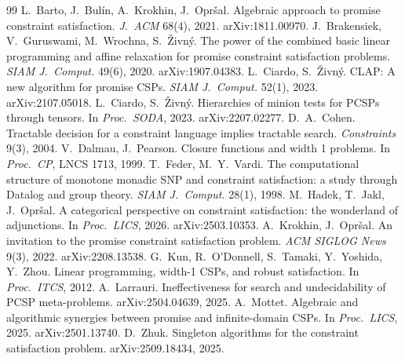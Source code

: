 \documentclass[11pt]{article}
\theoremstyle{plain}
\theoremstyle{definition}
\begin{document}
{\small
\begin{thebibliography}{99}
 L.~Barto, J.~Bulín, A.~Krokhin, J.~Opršal. Algebraic approach to promise constraint satisfaction. \emph{J.~ACM} 68(4), 2021. arXiv:1811.00970.
 J.~Brakensiek, V.~Guruswami, M.~Wrochna, S.~Živný. The power of the combined basic linear programming and affine relaxation for promise constraint satisfaction problems. \emph{SIAM J.~Comput.} 49(6), 2020. arXiv:1907.04383.
 L.~Ciardo, S.~Živný. CLAP: A new algorithm for promise CSPs. \emph{SIAM J.~Comput.} 52(1), 2023. arXiv:2107.05018.
 L.~Ciardo, S.~Živný. Hierarchies of minion tests for PCSPs through tensors. In \emph{Proc.\ SODA}, 2023. arXiv:2207.02277.
 D.~A.~Cohen. Tractable decision for a constraint language implies tractable search. \emph{Constraints} 9(3), 2004.
 V.~Dalmau, J.~Pearson. Closure functions and width 1 problems. In \emph{Proc.\ CP}, LNCS 1713, 1999.
 T.~Feder, M.~Y.~Vardi. The computational structure of monotone monadic SNP and constraint satisfaction: a study through Datalog and group theory. \emph{SIAM J.~Comput.} 28(1), 1998.
 M.~Hadek, T.~Jakl, J.~Opršal. A categorical perspective on constraint satisfaction: the wonderland of adjunctions. In \emph{Proc.\ LICS}, 2026. arXiv:2503.10353.
 A.~Krokhin, J.~Opršal. An invitation to the promise constraint satisfaction problem. \emph{ACM SIGLOG News} 9(3), 2022. arXiv:2208.13538.
 G.~Kun, R.~O'Donnell, S.~Tamaki, Y.~Yoshida, Y.~Zhou. Linear programming, width-1 CSPs, and robust satisfaction. In \emph{Proc.\ ITCS}, 2012.
 A.~Larrauri. Ineffectiveness for search and undecidability of PCSP meta-problems. arXiv:2504.04639, 2025.
 A.~Mottet. Algebraic and algorithmic synergies between promise and infinite-domain CSPs. In \emph{Proc.\ LICS}, 2025. arXiv:2501.13740.
 D.~Zhuk. Singleton algorithms for the constraint satisfaction problem. arXiv:2509.18434, 2025.
\end{thebibliography}
}
\end{document}

